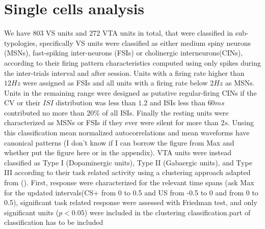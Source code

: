 \section{Single cells analysis}
We have $803$ VS units and $272$ VTA units in total, that were classified in sub-typologies, specifically VS units were classified as either medium spiny neurons (MSNs), fast-spiking inter-neurons (FSIs) or cholinergic interneurons(CINs), according to their firing pattern characteristics computed using only spikes during the inter-trials interval and after session. Units with a firing rate higher than $12 Hz$ were assigned as FSIs and all units with a firing rate below $2 Hz$ as MSNs. Units in the remaining range were designed as putative regular-firing CINs if the CV or their $ISI$ distribution was less than $1.2$ and ISIs less than $60 ms$ contributed no more than $20\%$ of all ISIs. Finally the resting units were characterized as MSNs or FSIs if they ever were silent for more than $2 s$. Unsing this classification mean normalized autocorrelations and mean waveforms have canonical patterns ({\color{red}I don't know if I can borrow the figure from Max and whether put the figure here or in the appendix}). %
VTA units were instead classified as Type I (Dopaminergic units), Type II (Gabaergic units), and Type III according to their task related activity using a clustering approach adapted from (\cite{Uchida}). First, response were characterized for the relevant time spans ({\color{red}ask Max for the updated intervals}(CS+ from 0 to 0.5 and US from -0.5 to 0 and from 0 to 0.5), significant task related response were assessed with Friedman test, and only significant units ($p<0.05$) were included in the clustering classification.{\color{red}part of classification has to be included}
